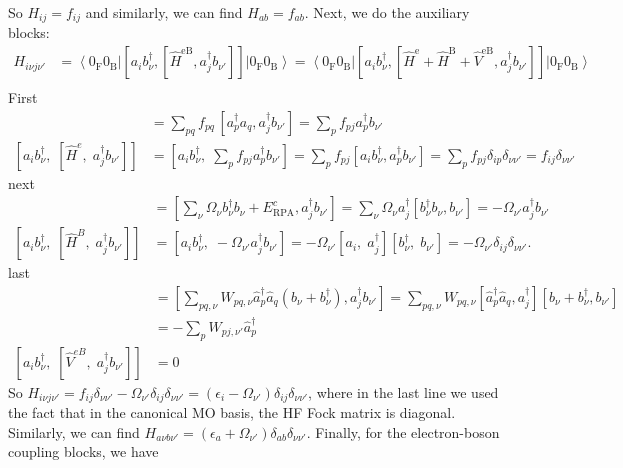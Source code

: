 So $H_{ij} = f_{ij}$ and similarly, we can find $H_{ab} = f_{ab}$. Next, we do the auxiliary blocks:
\begin{align}
H_{i \nu j \nu'} &= \left\langle 0_{\mathrm{F}} 0_{\mathrm{B}}\right|\left[a_i b_\nu^{\dagger}, \left[\hat{H}^{\mathrm{eB}}, a_j^{\dagger}b_{\nu'}\right]\right]\left|0_{\mathrm{F}} 0_{\mathrm{B}}\right\rangle = \left\langle 0_{\mathrm{F}} 0_{\mathrm{B}}\right|\left[a_i b_\nu^{\dagger}, \left[\hat{H}^{\mathrm{e}} + \hat{H}^{\mathrm{B}} + \hat{V}^{\mathrm{eB}}, a_j^{\dagger}b_{\nu'}\right]\right]\left|0_{\mathrm{F}} 0_{\mathrm{B}}\right\rangle \\
\end{align}
First
\begin{align}
[\hat H^e,\;a_j^\dagger b_{\nu'}] &= \sum_{p q}f_{pq}\,[a_p^\dagger a_q, a_j^{\dagger} b_{\nu'}] = \sum_{p}f_{pj}a_p^\dagger b_{\nu'} \\
[a_i b_\nu^\dagger,\;[\hat H^e,\;a_j^\dagger b_{\nu'}]] &= [a_i b_\nu^\dagger,\; \sum_{p}f_{pj} a_p^\dagger b_{\nu'}] = \sum_{p}f_{pj}[a_i b_\nu^\dagger, a_p^\dagger b_{\nu'}] = \sum_{p}f_{pj}\delta_{ip}\delta_{\nu\nu'} = f_{ij}\delta_{\nu\nu'}
\end{align}
next
\begin{align}
[\hat H^B,\;a_j^\dagger b_{\nu'}] &= [\sum_{\nu} \Omega_\nu {b}_\nu^{\dagger} {b}_\nu + E_{\mathrm{RPA}}^c, a_j^{\dagger} b_{\nu'}] = \sum_{\nu} \Omega_\nu a_j^{\dagger}[ {b}_\nu^{\dagger} {b}_\nu, b_{\nu'}] = - \Omega_{\nu'} a_j^{\dagger} {b}_{\nu'} \\
[a_i b_\nu^\dagger,\;[\hat H^B,\;a_j^\dagger b_{\nu'}]] &= [a_i b_\nu^\dagger,\;-\Omega_{\nu'} a_j^\dagger b_{\nu'}] = -\Omega_{\nu'} [a_i,\;a_j^\dagger] [b_\nu^\dagger,\;b_{\nu'}] = -\Omega_{\nu'} \delta_{ij} \delta_{\nu \nu'}.
\end{align}
last
\begin{align}
[\hat V^{eB},\;a_j^\dagger b_{\nu'}] &= [\sum_{p q, \nu} W_{p q, \nu} \hat{a}_p^{\dagger} \hat{a}_q \left({b}_\nu+{b}_\nu^{\dagger}\right), a_j^{\dagger} b_{\nu'}] = \sum_{p q, \nu} W_{p q, \nu} [\hat{a}_p^{\dagger} \hat{a}_q, a_j^{\dagger}] [{b}_\nu+{b}_\nu^{\dagger}, b_{\nu'}]\\
& = -\sum_{p} W_{p j, \nu'} \hat{a}_p^{\dagger} \\ [a_i b_\nu^\dagger,\;[\hat V^{eB},\;a_j^\dagger b_{\nu'}]] &= 0
\end{align}
So $H_{i\nu j \nu'} = f_{ij} \delta_{\nu \nu'} - \Omega_{\nu'} \delta_{ij} \delta_{\nu \nu'} = \left(\epsilon_i - \Omega_{\nu'}\right) \delta_{ij} \delta_{\nu \nu'}$, where in the last line we used the fact that in the canonical MO basis, the HF Fock matrix is diagonal. Similarly, we can find $H_{a \nu b \nu'} = \left(\epsilon_a + \Omega_{\nu'}\right) \delta_{ab} \delta_{\nu \nu'}$. Finally, for the electron-boson coupling blocks, we have
